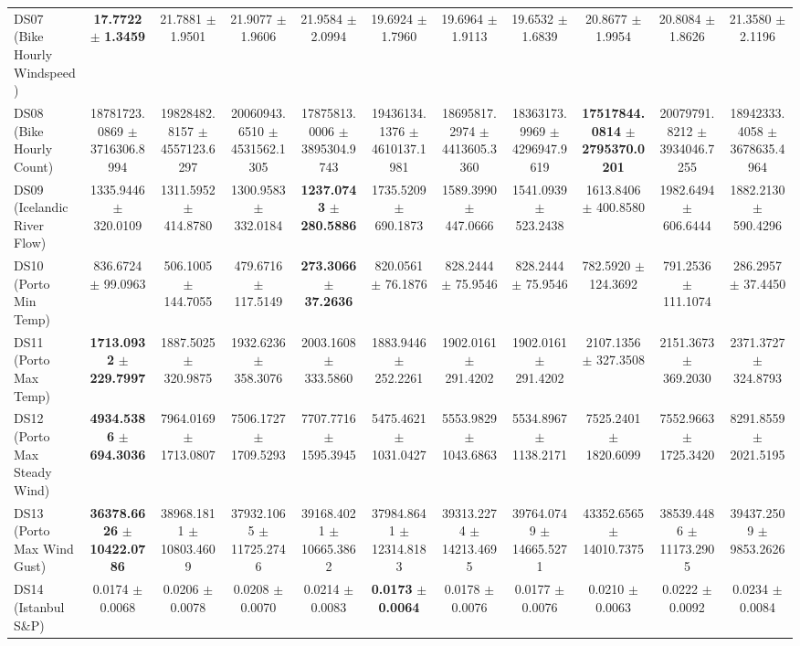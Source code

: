 \begin{table}[t]
{{\begin{tabular}{lcccccccccc}
DS07 (Bike Hourly Windspeed) & \textbf{17.7722} $\pm$ \textbf{1.3459} & 21.7881 $\pm$ 1.9501 & 21.9077 $\pm$ 1.9606 & 21.9584 $\pm$ 2.0994 & 19.6924 $\pm$ 1.7960 & 19.6964 $\pm$ 1.9113 & 19.6532 $\pm$ 1.6839 & 20.8677 $\pm$ 1.9954 & 20.8084 $\pm$ 1.8626 & 21.3580 $\pm$ 2.1196 \\
DS08 (Bike Hourly Count) & 18781723.0869 $\pm$ 3716306.8994 & 19828482.8157 $\pm$ 4557123.6297 & 20060943.6510 $\pm$ 4531562.1305 & 17875813.0006 $\pm$ 3895304.9743 & 19436134.1376 $\pm$ 4610137.1981 & 18695817.2974 $\pm$ 4413605.3360 & 18363173.9969 $\pm$ 4296947.9619 & \textbf{17517844.0814} $\pm$ \textbf{2795370.0201} & 20079791.8212 $\pm$ 3934046.7255 & 18942333.4058 $\pm$ 3678635.4964 \\
DS09 (Icelandic River Flow) & 1335.9446 $\pm$ 320.0109 & 1311.5952 $\pm$ 414.8780 & 1300.9583 $\pm$ 332.0184 & \textbf{1237.0743} $\pm$ \textbf{280.5886} & 1735.5209 $\pm$ 690.1873 & 1589.3990 $\pm$ 447.0666 & 1541.0939 $\pm$ 523.2438 & 1613.8406 $\pm$ 400.8580 & 1982.6494 $\pm$ 606.6444 & 1882.2130 $\pm$ 590.4296 \\
DS10 (Porto Min Temp) & 836.6724 $\pm$ 99.0963 & 506.1005 $\pm$ 144.7055 & 479.6716 $\pm$ 117.5149 & \textbf{273.3066} $\pm$ \textbf{37.2636} & 820.0561 $\pm$ 76.1876 & 828.2444 $\pm$ 75.9546 & 828.2444 $\pm$ 75.9546 & 782.5920 $\pm$ 124.3692 & 791.2536 $\pm$ 111.1074 & 286.2957 $\pm$ 37.4450 \\
DS11 (Porto Max Temp) & \textbf{1713.0932} $\pm$ \textbf{229.7997} & 1887.5025 $\pm$ 320.9875 & 1932.6236 $\pm$ 358.3076 & 2003.1608 $\pm$ 333.5860 & 1883.9446 $\pm$ 252.2261 & 1902.0161 $\pm$ 291.4202 & 1902.0161 $\pm$ 291.4202 & 2107.1356 $\pm$ 327.3508 & 2151.3673 $\pm$ 369.2030 & 2371.3727 $\pm$ 324.8793 \\
DS12 (Porto Max Steady Wind) & \textbf{4934.5386} $\pm$ \textbf{694.3036} & 7964.0169 $\pm$ 1713.0807 & 7506.1727 $\pm$ 1709.5293 & 7707.7716 $\pm$ 1595.3945 & 5475.4621 $\pm$ 1031.0427 & 5553.9829 $\pm$ 1043.6863 & 5534.8967 $\pm$ 1138.2171 & 7525.2401 $\pm$ 1820.6099 & 7552.9663 $\pm$ 1725.3420 & 8291.8559 $\pm$ 2021.5195 \\
DS13 (Porto Max Wind Gust) & \textbf{36378.6626} $\pm$ \textbf{10422.0786} & 38968.1811 $\pm$ 10803.4609 & 37932.1065 $\pm$ 11725.2746 & 39168.4021 $\pm$ 10665.3862 & 37984.8641 $\pm$ 12314.8183 & 39313.2274 $\pm$ 14213.4695 & 39764.0749 $\pm$ 14665.5271 & 43352.6565 $\pm$ 14010.7375 & 38539.4486 $\pm$ 11173.2905 & 39437.2509 $\pm$ 9853.2626 \\
DS14 (Istanbul S\&P) & 0.0174 $\pm$ 0.0068 & 0.0206 $\pm$ 0.0078 & 0.0208 $\pm$ 0.0070 & 0.0214 $\pm$ 0.0083 & \textbf{0.0173} $\pm$ \textbf{0.0064} & 0.0178 $\pm$ 0.0076 & 0.0177 $\pm$ 0.0076 & 0.0210 $\pm$ 0.0063 & 0.0222 $\pm$ 0.0092 & 0.0234 $\pm$ 0.0084 \\

\end{tabular}}}
\end{table}
